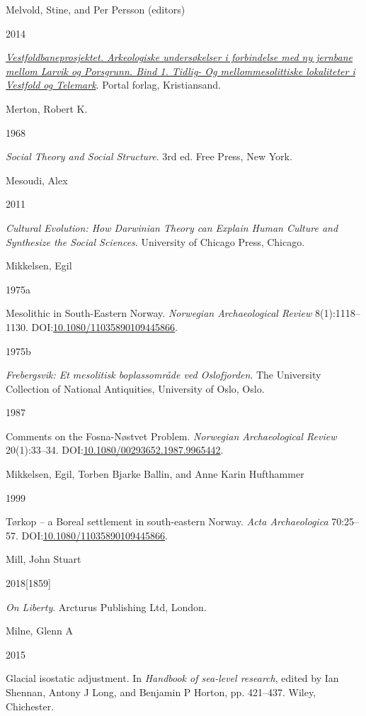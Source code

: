 \documentclass[
  12pt,
  a4paper,
  oneside]{book}
\newlength{\cslhangindent}
\newlength{\csllabelwidth}
\newlength{\cslentryspacingunit} %
\newenvironment{CSLReferences}[2] %
 {%
  \setlength{\parindent}{0pt}
  \ifodd #1
  \let\oldpar\par
  \def\par{\hangindent=\cslhangindent\oldpar}
  \fi
  \setlength{\parskip}{#2\cslentryspacingunit}
 }%
 {}
\newcommand{\CSLBlock}[1]{#1\hfill\break}
\newcommand{\CSLLeftMargin}[1]{\parbox[t]{\csllabelwidth}{#1}}
\newcommand{\CSLRightInline}[1]{\parbox[t]{\linewidth - \csllabelwidth}{#1}\break}
\begin{document}
\begin{CSLReferences}{0}{0}
\leavevmode{}%
\CSLBlock{Melvold, Stine, and Per Persson (editors)}
\CSLLeftMargin{ 2014}
\CSLRightInline{\emph{\href{https://doi.org/10.23865/noasp.61}{{Vestfoldbaneprosjektet. Arkeologiske undersøkelser i forbindelse med ny jernbane mellom Larvik og Porsgrunn. Bind 1. Tidlig- Og mellommesolittiske lokaliteter i Vestfold og Telemark}}}. Portal forlag, Kristiansand.}

\leavevmode{}%
\CSLBlock{Merton, Robert K.}
\CSLLeftMargin{ 1968}
\CSLRightInline{\emph{{Social Theory and Social Structure}}. 3rd ed. Free Press, New York.}

\leavevmode{}%
\CSLBlock{Mesoudi, Alex}
\CSLLeftMargin{ 2011}
\CSLRightInline{\emph{{Cultural Evolution: How Darwinian Theory can Explain Human Culture and Synthesize the Social Sciences}}. University of Chicago Press, Chicago.}

\leavevmode{}%
\CSLBlock{Mikkelsen, Egil}
\CSLLeftMargin{ 1975a}
\CSLRightInline{{Mesolithic in South-Eastern Norway}. \emph{Norwegian Archaeological Review} 8(1):1118--1130. DOI:\href{https://doi.org/10.1080/11035890109445866}{10.1080/11035890109445866}.}

\leavevmode{}%
\CSLLeftMargin{ 1975b }
\CSLRightInline{\emph{{Frebergsvik: Et mesolitisk boplassområde ved Oslofjorden}}. The University Collection of National Antiquities, University of Oslo, Oslo.}

\leavevmode{}%
\CSLLeftMargin{ 1987 }
\CSLRightInline{{Comments on the Fosna-Nøstvet Problem}. \emph{Norwegian Archaeological Review} 20(1):33--34. DOI:\href{https://doi.org/10.1080/00293652.1987.9965442}{10.1080/00293652.1987.9965442}.}

\leavevmode{}%
\CSLBlock{Mikkelsen, Egil, Torben Bjarke Ballin, and Anne Karin Hufthammer}
\CSLLeftMargin{ 1999}
\CSLRightInline{{Tørkop -- a Boreal settlement in south-eastern Norway}. \emph{Acta Archaeologica} 70:25--57. DOI:\href{https://doi.org/10.1080/11035890109445866}{10.1080/11035890109445866}.}

\leavevmode{}%
\CSLBlock{Mill, John Stuart}
\CSLLeftMargin{ 2018{[}1859{]}}
\CSLRightInline{\emph{{On Liberty}}. Arcturus Publishing Ltd, London.}

\leavevmode{}%
\CSLBlock{Milne, Glenn A}
\CSLLeftMargin{ 2015}
\CSLRightInline{Glacial isostatic adjustment. In \emph{Handbook of sea-level research}, edited by Ian Shennan, Antony J Long, and Benjamin P Horton, pp. 421--437. Wiley, Chichester.}


\end{CSLReferences}
\end{document}
